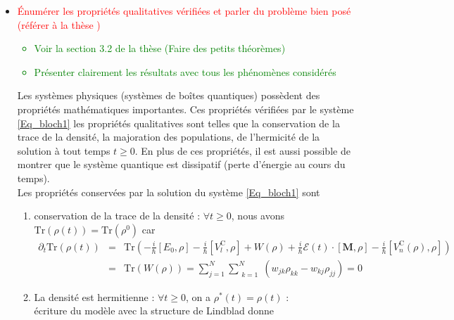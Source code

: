 \documentclass[a4paper]{article}
\newcommand{\dt}{\partial_{t}}
\newcommand{\rC}{\mathrm{C}}
\newcommand{\Tr}{{\mathrm{Tr}}}
\begin{document}
\begin{itemize}
\\Ce modèle est non linéaire (semi-linéaire) et l'application 
$$\rho \in I \mapsto F(t,\rho) \in I$$
est polynomiale en $\rho$ avec $I \subset \mathcal{M}_N(\mathbb{C})$ et $(\mathcal{M}_N(\mathbb{C}),\|.\|)$ est un espace de Banach.  Alors $F$ est localement lipschitzienne en $\rho$. Grâce au théorème de Cauchy-Lipschitz, nous pouvons déduire que le système de Cauchy \eqref{Eq_bloch2} admet une unique solution locale en temps à partir de la densité initiale $\rho^0$.
%
\item \textcolor{red}{Énumérer les propriétés qualitatives vérifiées et parler du problème bien posé  (référer à la thèse )}
\textcolor{green}{\begin{itemize}
 \item Voir la section 3.2 de la thèse (Faire des petits théorèmes)
\item Présenter clairement les résultats avec tous les phénomènes considérés
\end{itemize}}
Les systèmes physiques (systèmes de boîtes quantiques) possèdent des propriétés mathématiques importantes. Ces propriétés  vérifiées par le système \eqref{Eq_bloch1}  les propriétés qualitatives sont telles que la conservation de la trace de la densité,  la majoration des populations,  de l'hermicité  de la solution à tout temps $t \geq 0$. En plus de ces propriétés, il est aussi possible de montrer que le système quantique est dissipatif (perte d'énergie au cours du temps).
\\ Les propriétés conservées par la solution du système \eqref{Eq_bloch1} sont
\begin{enumerate}
\item conservation de la trace de la densité : $\forall t \geq 0$, nous avons  $\Tr(\rho(t)) = \Tr(\rho^0)$ car
\begin{eqnarray*}
\dt \Tr(\rho(t)) &=&\Tr\left(-\frac{i}{\hbar}\left[ E_0,\rho\right] -\frac{i}{\hbar}\left[ V_{l}^{\rC},\rho\right] + W(\rho) +\frac{i}{\hbar}\mathcal{E}(t) \cdot \left[ \textbf{M},\rho\right] - \frac{i}{\hbar}\left[ V^{\rC}_{n} (\rho),\rho\right]\right) \\
                       &=& \Tr( W(\rho))= \sum_{j=1}^{N} \sum_{\substack{k=1}}^{N} \left( w_{jk} \rho_{kk} - w_{kj} \rho_{jj} \right)=0
\end{eqnarray*}
\item La densité est hermitienne : $\forall t \geq 0$, on  a $\rho^*(t)=\rho(t)$ :
\\écriture du modèle avec la structure de Lindblad donne 

\end{enumerate}
\end{itemize}
\end{document}
